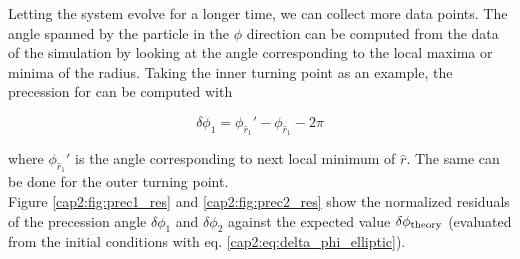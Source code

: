 Letting the system evolve for a longer time, we can collect more data points.
The angle spanned by the particle in the $\phi$ direction can be computed from
the data of the simulation by looking at the angle corresponding to the local
maxima or minima of the radius.
Taking the inner turning point as an example, the precession for can be computed 
with

\begin{equation}
    \delta \phi_1 = \phi_{\hat r_1}' - \phi_{\hat r_1} - 2 \pi
\end{equation}

where $\phi_{\hat r_1}'$ is the angle corresponding to next local minimum of
$\hat r$. The same can be done for the outer turning point. \\
Figure \ref{cap2:fig:prec1_res} and \ref{cap2:fig:prec2_res} show the normalized
residuals of the precession angle $\delta \phi_1$ and $\delta \phi_2$ against
the expected value $\delta \phi_{\rm theory}$ (evaluated from the initial
conditions with eq. \ref{cap2:eq:delta_phi_elliptic}).

